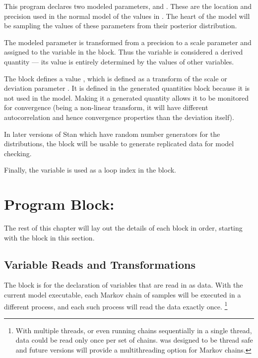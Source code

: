 This program declares two modeled parameters,  and
.  These are the location and precision used in the normal
model of the values in .  The heart of the model will be
sampling the values of these parameters from their posterior
distribution.

The modeled parameter  is transformed from a precision to
a scale parameter and assigned to the variable  in the
 block. Thus the variable 
is considered a derived quantity --- its value is entirely determined
by the values of other variables.  

The  block defines a value
, which is defined as a transform of the scale or
deviation parameter .  It is defined in the generated
quantities block because it is not used in the model.  Making it
a generated quantity allows it to be monitored for convergence (being
a non-linear transform, it will have different autocorrelation and
hence convergence properties than the deviation itself).  

In later versions of Stan which have random number generators for
the distributions, the  block will be
usable to generate replicated data for model checking.

Finally, the variable  is used as a loop index in the
 block.  


\section{Program Block: }

The rest of this chapter will lay out the details of each block in
order, starting with the  block in this section.

\subsection{Variable Reads and Transformations}

The  block is for the declaration of variables that are
read in as data.  With the current model executable, each Markov chain
of samples will be executed in a different process, and each such
process will read the data exactly once.%
%
\footnote{With multiple threads, or even running chains sequentially
  in a single thread, data could be read only once per set of
  chains. \Stan was designed to be thread safe and future versions 
  will provide a multithreading option for Markov chains.\label{thread.footnote}}
%

